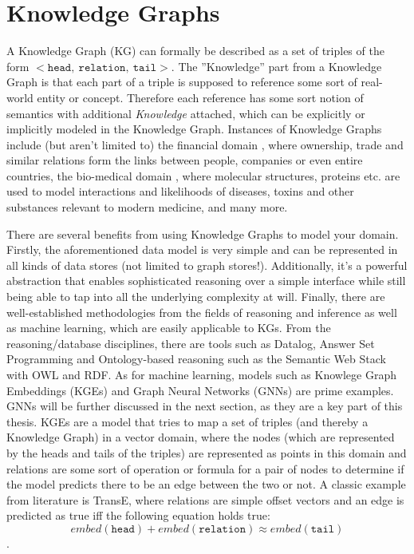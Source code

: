 \documentclass[draft,final]{vutinfth} %
\begin{document}
\section{Knowledge Graphs}
A Knowledge Graph (KG) can formally be described as a set of triples of the form 
$\mathtt{< head,\ relation,\ tail>}$. The ''Knowledge'' part from a Knowledge Graph is that each part of a triple is supposed to reference some sort of real-world entity or concept. Therefore each reference has some sort notion of semantics with additional \textit{Knowledge} attached, which can be explicitly or implicitly modeled in the Knowledge Graph. Instances of Knowledge Graphs include (but aren't limited to) the financial domain \cite{Bellomarini_Magnanimi_Nissl_Sallinger_2021}, where ownership, trade and similar relations form the links between people, companies or even entire countries, the bio-medical domain \cite{Lu_Goi_Zhao_Wang_2025}, where molecular structures, proteins etc. are used to model interactions and likelihoods of diseases, toxins and other substances relevant to modern medicine, and many more.

There are several benefits from using Knowledge Graphs to model your domain. Firstly, the aforementioned data model is very simple and can be represented in all kinds of data stores (not limited to graph stores!). Additionally, it's a powerful abstraction that enables sophisticated reasoning over a simple interface while still being able to tap into all the underlying complexity at will. Finally, there are well-established methodologies from the fields of reasoning and inference as well as machine learning, which are easily applicable to KGs. From the reasoning/database disciplines, there are tools such as Datalog, Answer Set Programming and Ontology-based reasoning such as the Semantic Web Stack with OWL and RDF. As for machine learning, models such as Knowlege Graph Embeddings (KGEs) and Graph Neural Networks (GNNs) are prime examples. GNNs will be further discussed in the next section, as they are a key part of this thesis. KGEs are a model that tries to map a set of triples (and thereby a Knowledge Graph) in a vector domain, where the nodes (which are represented by the heads and tails of the triples) are represented as points in this domain and relations are some sort of operation or formula for a pair of nodes to determine if the model predicts there to be an edge between the two or not. A classic example from literature is TransE, where relations are simple offset vectors and an edge is predicted as true iff the following equation holds true: $$embed(\mathtt{head}) + embed(\mathtt{relation}) \approx embed(\mathtt{tail})$$. 
\end{document}
